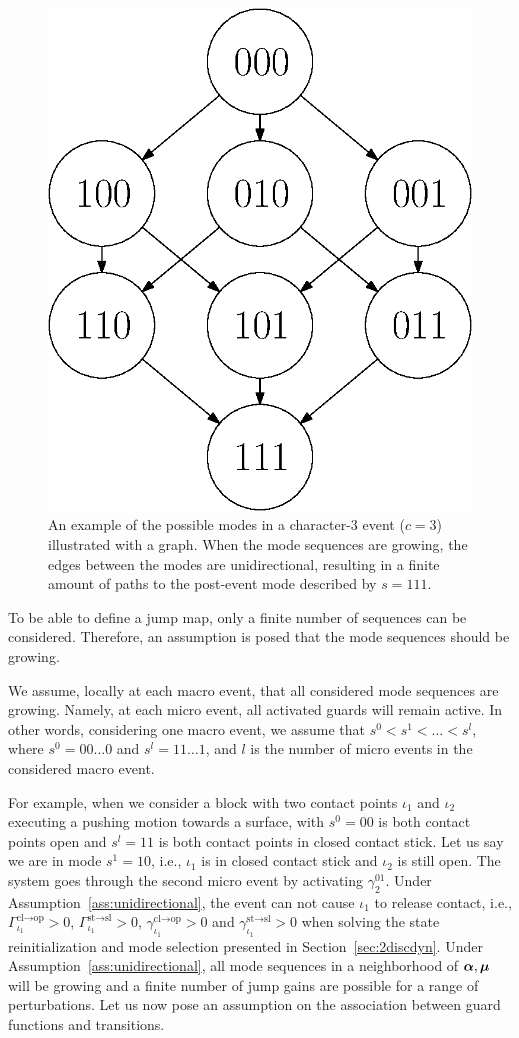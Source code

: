 \documentclass[../DC2017114Bouma.tex]{subfiles}
\begin{document}
\begin{figure}[bt!]
\centering
\includegraphics[width=.35\textwidth]{4growingseq.eps}\caption{An example of the possible modes in a character-3 event ($c=3$)  illustrated with a graph. When the mode sequences are growing, the edges between the modes are unidirectional, resulting in a finite amount of paths to the post-event mode described by $s = 111$.}\label{fig:4growingseq}
\end{figure}

To be able to define a jump map, only a finite number of sequences can be considered. Therefore, an assumption is posed that the mode sequences should be growing.

\begin{sloppypar}
\begin{myass}\label{ass:unidirectional}
We assume, locally at each macro event, that all considered mode sequences are growing. Namely, at each micro event, all activated guards will remain active. In other words, considering one macro event, we assume that $s^0<s^1<\dots<s^l$, where $s^0= 00\dots0$ and $s^l = 11\dots1$, and $l$ is the number of micro events in the considered macro event.
\end{myass}
\end{sloppypar}

For example, when we consider a block with two contact points $\iota_1$ and $\iota_2$ executing a pushing motion towards a surface, with $s^0 = 00$ is both contact points open and $s^l = 11$ is both contact points in closed contact stick. Let us say we are in mode $s^1 = 10$, i.e., $\iota_1$ is in closed contact stick and $\iota_2$ is still open. The system goes through the second micro event by activating $\gamma^{01}_2$. Under Assumption~\ref{ass:unidirectional}, the event can not cause $\iota_1$ to release contact, i.e., $\Gamma_{\iota_1}^{\text{cl}\rightarrow\text{op}}>0$, $\Gamma_{\iota_1}^{\text{st}\rightarrow\text{sl}}>0$, $\gamma_{\iota_1}^{\text{cl}\rightarrow\text{op}}>0$ and $\gamma_{\iota_1}^{\text{st}\rightarrow\text{sl}}>0$ when solving the state reinitialization and mode selection presented in Section~\ref{sec:2discdyn}. Under Assumption~\ref{ass:unidirectional}, all mode sequences in a neighborhood of $\boldsymbol{\alpha},\boldsymbol{\mu}$ will be growing and a finite number of jump gains are possible for a range of perturbations. Let us now pose an assumption on the association between guard functions and transitions.
\end{document}
